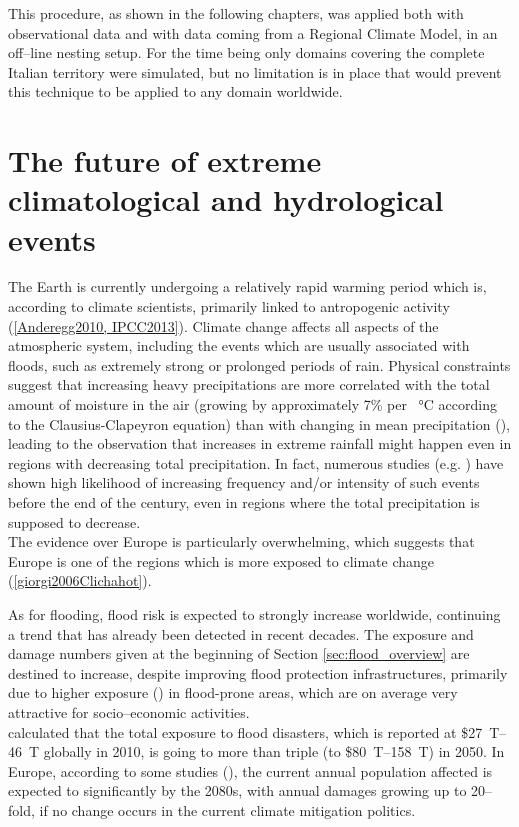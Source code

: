 This procedure, as shown in the following chapters, was applied both with observational data and with data coming from a Regional Climate Model, in an off--line nesting setup. For the time being only domains covering the complete Italian territory were simulated, but no limitation is in place that would prevent this technique to be applied to any domain worldwide.


\section{The future of extreme climatological and hydrological events}
The Earth is currently undergoing a relatively rapid warming period which is, according to climate scientists, primarily linked to antropogenic activity (\ref{Anderegg2010, IPCC2013}). Climate change affects all aspects of the atmospheric system, including the events which are usually associated with floods, such as extremely strong or prolonged periods of rain. Physical constraints suggest that increasing heavy precipitations are more correlated with the total amount of moisture in the air (growing by approximately 7\% per \SI{}{\celsius} according to the Clausius-Clapeyron equation) than with changing in mean precipitation (\cite{Allen2002}), leading to the observation that increases in extreme rainfall might happen even in regions with decreasing total precipitation. In fact, numerous studies (e.g. \cite{Frei2006a, Christensen2004, Rajczak2013a, Pal2004, Durman2001, KleinTank2003, Fowler2003}) have shown high likelihood of increasing frequency and/or intensity of such events before the end of the century, even in regions where the total precipitation is supposed to decrease.\\
The evidence over Europe is particularly overwhelming, which suggests that Europe is one of the regions which is more exposed to climate change (\ref{giorgi2006Clichahot}).

As for flooding, flood risk is expected to strongly increase worldwide, continuing a trend that has already been detected in recent decades. The exposure and damage numbers given at the beginning of Section \ref{sec:flood_overview} are destined to increase, despite improving flood protection infrastructures, primarily due to higher exposure (\cite{MunichRE2015, Kron2005, Hirabayashi2009, Mitchell2003}) in flood-prone areas, which are on average very attractive for socio--economic activities.\\
\cite{Jongman2012} calculated that the total exposure to flood disasters, which is reported at \$\SIrange{27}{46}{T} globally in 2010, is going to more than triple (to \$\SIrange{80}{158}{T}) in 2050. In Europe, according to some studies (\cite{Rojas2013, Alfieri2015}), the current annual population affected is expected to significantly by the 2080s, with annual damages growing up to 20--fold, if no change occurs in the current climate mitigation politics.


